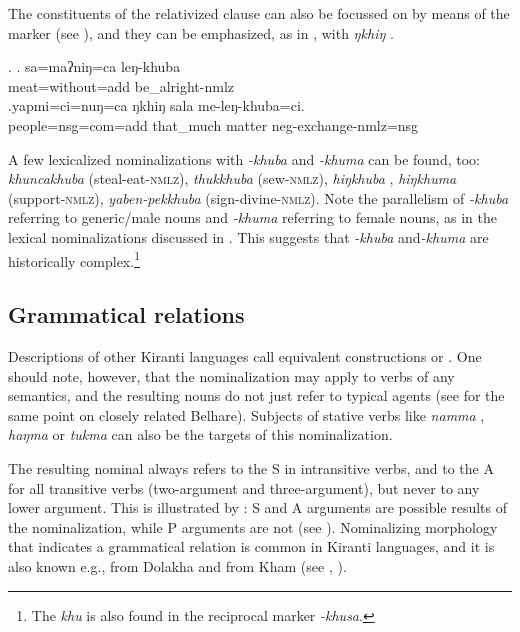 The constituents of the relativized clause can also be focussed on by means of the  marker (see \Next[a]), and  they can be emphasized, as in \Next[b], with \emph{ŋkhiŋ} .

   \ex. \ag. sa=maʔniŋ=ca leŋ-khuba\\
		meat=without{\sc =add} be\_alright{\sc -nmlz}\\
	\bg.yapmi=ci=nuŋ=ca  ŋkhiŋ   sala   me-leŋ-khuba=ci.\\
		people{\sc =nsg=com=add} that\_much matter {\sc neg}-exchange-{\sc nmlz=nsg}\\
	      

	
A few lexicalized nominalizations with \emph{-khuba} and \emph{-khuma} can be found, too: \emph{khuncakhuba}  (steal-eat-\textsc{nmlz}), \emph{thukkhuba}  (sew-\textsc{nmlz}), \emph{hiŋ\-khuba} , \emph{hiŋ\-khuma}  (support-\textsc{nmlz}), \emph{yaben-pekkhuba}  (sign-divine-\textsc{nmlz}). Note the parallelism of \emph{-khuba} referring to generic/male nouns and \emph{-khuma} referring to female nouns, as in the lexical nominalizations discussed in . This suggests that \emph{-khuba} and\emph{-khuma} are historically complex.\footnote{The  \emph{khu} is also found in the reciprocal marker \emph{-khusa}.}

\subsection{Grammatical relations}\label{khuba-gr}

Descriptions of other Kiranti languages call equivalent constructions  or  \citep{Tolsma1999A-grammar, Rutgers1998Yamphu, Ebert1997A-grammar, Ebert1999Nonfinite, Doornenbal2009A-grammar}. One should note, however, that the nominalization may apply to verbs of any semantics, and the resulting nouns do not just refer to typical agents (see \citet[180]{Bickel2004Hidden} for the same point on closely related Belhare). Subjects of stative verbs like \emph{namma} , \emph{haŋma}  or \emph{tukma}  can also be the targets of this nominalization. 
 
The resulting nominal always refers to the S in intransitive verbs, and to the A for all transitive verbs (two-argument and three-argument), but never to any lower argument. This is illustrated by \Next: S and A arguments are possible results of the nominalization, while P arguments are not (see \Next[c]). Nominalizing morphology that indicates a grammatical relation is common in Kiranti languages, and it is also known e.g., from  Dolakha  and from Kham (see \citet[409]{Genetti1992Semantic}, \citealt[376]{Ebert1999Nonfinite}). 
	
